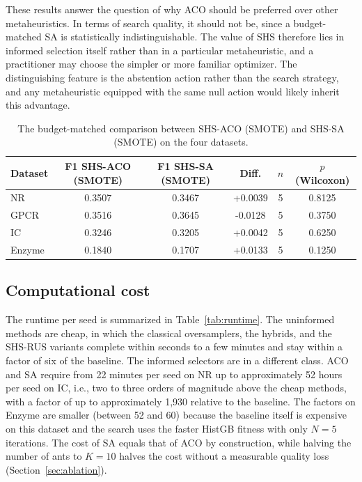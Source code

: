 \documentclass[pdflatex,sn-basic]{sn-jnl}
\begin{document}
These results answer the question of why ACO should be preferred over
other metaheuristics. In terms of search quality, it should not be,
since a budget-matched SA \citep{kirkpatrick1983optimization,
chennuru2022simulated} is statistically indistinguishable. The value of
SHS therefore lies in informed selection itself rather than in a
particular metaheuristic, and a practitioner may choose the simpler or
more familiar optimizer. The distinguishing feature is the abstention
action rather than the search strategy, and any metaheuristic equipped
with the same null action would likely inherit this advantage.

\begin{table}[htbp]
\centering
\caption{The budget-matched comparison between SHS-ACO (SMOTE) and
SHS-SA (SMOTE) on the four datasets.}
\label{tab:savsaco}
\footnotesize
\begin{tabular}{lccccc}
\toprule
Dataset & F1 SHS-ACO (SMOTE) & F1 SHS-SA (SMOTE) & Diff. & $n$ & $p$ (Wilcoxon) \\
\midrule
NR & 0.3507 & 0.3467 & +0.0039 & 5 & 0.8125 \\
GPCR & 0.3516 & 0.3645 & -0.0128 & 5 & 0.3750 \\
IC & 0.3246 & 0.3205 & +0.0042 & 5 & 0.6250 \\
Enzyme & 0.1840 & 0.1707 & +0.0133 & 5 & 0.1250 \\
\bottomrule
\end{tabular}
\end{table}

\subsection{Computational cost}
The runtime per seed is summarized in Table~\ref{tab:runtime}. The
uninformed methods are cheap, in which the classical oversamplers, the
hybrids, and the SHS-RUS variants complete within seconds to a few
minutes and stay within a factor of six of the baseline. The informed
selectors are in a different class. ACO and SA require from 22 minutes
per seed on NR up to approximately 52 hours per seed on IC, i.e., two to
three orders of magnitude above the cheap methods, with a factor of up to approximately 1,930 relative to the baseline. The factors on Enzyme are smaller
(between 52 and 60) because the baseline itself is expensive on this
dataset and the search uses the faster HistGB fitness with only $N = 5$ iterations. The cost of SA
equals that of ACO by construction, while halving the number of ants to
$K = 10$ halves the cost without a measurable quality loss
(Section~\ref{sec:ablation}).
\end{document}

